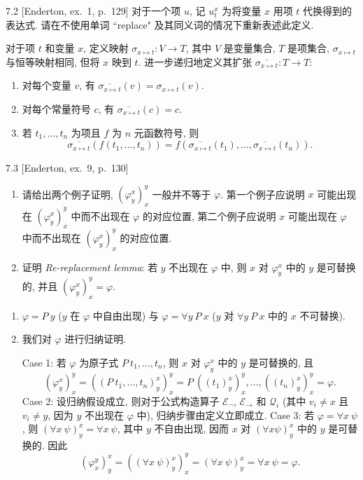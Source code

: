 \begin{exercise}{7.2}
  [Enderton, ex.~1, p.~129]
  对于一个项 $u$, 记 $u_t^x$ 为将变量 $x$ 用项 $t$ 代换得到的表达式. 请在不使用单词 ``replace" 及其同义词的情况下重新表述此定义.
\end{exercise}

对于项 $t$ 和变量 $x$, 定义映射 $\sigma_{x\mapsto t}:V\rightarrow T$, 其中 $V$ 是变量集合, $T$ 是项集合, $\sigma_{x\mapsto t}$ 与恒等映射相同, 但将 $x$ 映到 $t$. 进一步递归地定义其扩张 $\overline{\sigma_{x\mapsto t}}:T\rightarrow T$:
\begin{enumerate}
  \item 对每个变量 $v$, 有 $\overline{\sigma_{x\mapsto t}}(v)=\sigma_{x\mapsto t}(v)$.
  \item 对每个常量符号 $c$, 有 $\overline{\sigma_{x\mapsto t}}(c)=c$.
  \item 若 $t_1,\dots,t_n$ 为项且 $f$ 为 $n$ 元函数符号, 则
        \[\overline{\sigma_{x\mapsto t}}(f(t_1,\dots,t_n))=f(\overline{\sigma_{x\mapsto t}}(t_1),\dots,\overline{\sigma_{x\mapsto t}}(t_n)).\]
\end{enumerate}

\begin{exercise}{7.3}
  [Enderton, ex.~9, p.~130]
  \begin{enumerate}[label=(\alph*)]
    \item 请给出两个例子证明, $(\varphi_y^x)_x^y$ 一般并不等于 $\varphi$. 第一个例子应说明 $x$ 可能出现在 $(\varphi_y^x)_x^y$ 中而不出现在 $\varphi$ 的对应位置, 第二个例子应说明 $x$ 可能出现在 $\varphi$ 中而不出现在 $(\varphi_y^x)_x^y$ 的对应位置.
    \item 证明 \textit{Re-replacement lemma}: 若 $y$ 不出现在 $\varphi$ 中, 则 $x$ 对 $\varphi_y^x$ 中的 $y$ 是可替换的, 并且 $(\varphi_y^x)_x^y=\varphi$.\qedhere
  \end{enumerate}
\end{exercise}

\begin{enumerate}[label=(\alph*)]
  \item $\varphi=P\ y$ ($y$ 在 $\varphi$ 中自由出现) 与 $\varphi=\forall y\ P\ x$ ($y$ 对 $\forall y\ P\ x$ 中的 $x$ 不可替换).
  \item
        我们对 $\varphi$ 进行归纳证明.

        Case 1: 若 $\varphi$ 为原子式 $P\ t_1,\dots,t_n$, 则 $x$ 对 $\varphi_y^x$ 中的 $y$ 是可替换的, 且
        \[
          (\varphi_y^x)_x^y = ((P\ t_1,\dots,t_n)_y^x)_x^y = P\ ((t_1)_y^x)_x^y,\dots,((t_n)_y^x)_x^y=\varphi.
        \]
        Case 2: 设归纳假设成立, 则对于公式构造算子 $\mathcal{E}_{\neg}$, $\mathcal{E}_{\rightarrow}$ 和 $\mathcal{Q}_i$ (其中 $v_i\neq x$ 且 $v_i\neq y$, 因为 $y$ 不出现在 $\varphi$ 中), 归纳步骤由定义立即成立.\newline
        Case 3: 若 $\varphi=\forall x\ \psi$, 则 $(\forall x\ \psi)_y^x=\forall x\ \psi$, 其中 $y$ 不自由出现, 因而 $x$ 对 $(\forall x \psi)_y^x$ 中的 $y$ 是可替换的. 因此
        \[
          (\varphi_x^y)_y^x=((\forall x\ \psi)_y^x)_x^y=(\forall x\ \psi)_y^x=\forall x\ \psi=\varphi.
        \]
\end{enumerate}
